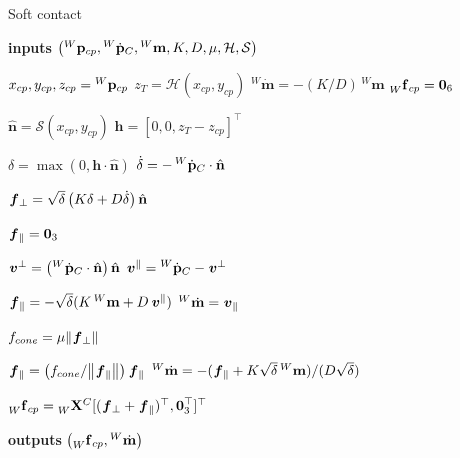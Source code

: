 \begin{algorithm}
\caption{Soft contact}
\label{algo:soft_contacts}
\begin{algorithmic}[1]
\small

\State \textbf{inputs} $\left( \pos[W]_{cp}, \posd[W]_C, {}^W \mathbf{m}, K, D, \mu, \mathcal{H}, \mathcal{S} \right)$

\State $x_{cp}, y_{cp}, z_{cp} = \pos[W]_{cp}$
\State $z_T = \mathcal{H}(x_{cp}, y_{cp})$
\State ${}^W \dot{\mathbf{m}} = -(K / D) \, {}^W \mathbf{m}$
\State $\forcesix[W]_{cp} = \zeros_6$

\State $\hat{\mathbf{n}} = \mathcal{S}(x_{cp}, y_{cp})$
\State $\mathbf{h} = \left[0, 0, z_T - z_{cp}\right]^\top$

\State $\delta = \max(0, \mathbf{h} \cdot \hat{\mathbf{n}})$
\State $\dot{\delta} = -\posd[W]_C \cdot \hat{\mathbf{n}}$

\State $\forcelin_\perp = \sqrt{\delta} \left( K \delta + D \dot{\delta} \right) \hat{\mathbf{n}}$

\State $\forcelin_\parallel = \zeros_3$

    \State $\vellin^\perp = \left( \posd[W]_C \cdot \hat{\mathbf{n}} \right) \hat{\mathbf{n}}$
    \State $\vellin^\parallel = \posd[W]_C - \vellin^\perp$

    \State $\forcelin_\parallel = -\sqrt{\delta}(K \, {}^W \mathbf{m} + D  \vellin^\parallel)$
    \State ${}^W \dot{\mathbf{m}} = \vellin_\parallel$

    \State $f_{cone} = \mu \norm{\forcelin_\perp}$
    
        \State $\forcelin_\parallel = \left(f_{cone} / \norm{\forcelin_\parallel}\right) \forcelin_\parallel$
        \State ${}^W \dot{\mathbf{m}} = -(\forcelin_\parallel + K \sqrt{\delta} \, {}^W \mathbf{m}) / (D \sqrt{\delta})$
    \EndIf
\EndIf

\State $\forcesix[W]_{cp} = \transfor[W]^C [(\forcelin_\perp + \forcelin_\parallel)^\top, \zeros^\top_3]^\top$

\State \textbf{outputs} $\left(\forcesix[W]_{cp}, {}^W \dot{\mathbf{m}}\right)$

\end{algorithmic}
\end{algorithm}


